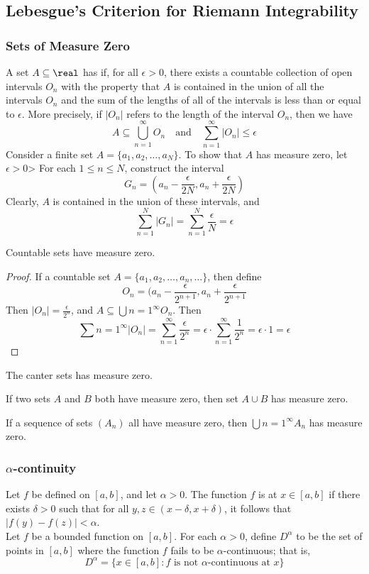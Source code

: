 \documentclass[11pt]{article}
\begin{document}
\subsection{Lebesgue's Criterion for Riemann Integrability}
\subsubsection{Sets of Measure Zero}
A set $A \subseteq \real$ has  if, for all $\epsilon > 0$, there exists a countable collection of open intervals $O_n$ with the property that $A$ is contained in the union of all the intervals $O_n$ and the sum of the lengths of all of the intervals is less than or equal to $\epsilon$.  More precisely, if $|O_n|$ refers to the length of the interval $O_n$, then we have
$$A \subseteq \bigcup_{n=1}^\infty O_n \quad \text{and} \quad \sum_{n=1}^\infty |O_n|\leq \epsilon$$
\example
Consider a finite set $A = \{a_1, a_2, \hdots, a_N\}$. To show that $A$ has measure zero, let $\epsilon > 0$> For each $1 \leq n \leq N$, construct the interval
$$G_n = \left( a_n - \frac{\epsilon}{2N}, a_n + \frac{\epsilon}{2N}\right)$$
Clearly, $A$ is contained in the union of these intervals, and
$$\sum_{n=1}^N |G_n| = \sum_{n=1}^N \frac{\epsilon}{N} = \epsilon$$

\theorem Countable sets have measure zero.
\begin{proof}
	If a countable set $A = \{a_1, a_2, \hdots, a_n, \hdots\}$, then define
	$$O_n = (a_n - \frac{\epsilon}{2^{n+1}}, a_n + \frac{\epsilon}{2^{n+1}}$$
	Then $|O_n| = \frac{\epsilon}{2^n}$, and $A \subseteq \bigcup{n=1}^\infty O_n$. Then
	$$\sum{n=1}^\infty |O_n| = \sum_{n=1}^\infty \frac{\epsilon}{2^n} = \epsilon \cdot \sum_{n=1}^\infty \frac{1}{2^n} = \epsilon \cdot 1 = \epsilon$$
\end{proof}

\theorem The canter sets has measure zero.

\fact If two sets $A$ and $B$ both have measure zero, then set $A \cup B$ has measure zero.

\fact If a sequence of sets $(A_n)$ all have measure zero, then $\bigcup{n=1}^\infty A_n$ has measure zero.

\subsubsection{$\alpha$-continuity}
 Let $f$ be defined on $[a,b]$, and let $\alpha > 0$. The function $f$ is  at $x \in [a,b]$ if there exists $\delta > 0$ such that for all $y, z \in (x - \delta, x + \delta)$, it follows that $|f(y) - f(z)| < \alpha$.\\
Let $f$ be a bounded function on $[a,b]$. For each $\alpha > 0$, define $D^\alpha$ to be the set of points in $[a,b]$ where the function $f$ fails to be $\alpha$-continuous; that is,
$$D^\alpha = \{x \in [a,b]: f \text{ is not $\alpha$-continuous at $x$}\}$$
\end{document}
